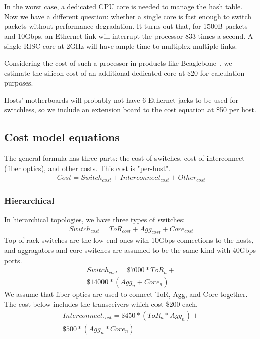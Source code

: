 In the worst case, a dedicated CPU core is needed to manage the hash table. Now we have a different question: whether a single core is fast enough to switch packets without performance degradation. It turns out that, for 1500B packets and 10Gbps, an Ethernet link will interrupt the processor 833 times a second. A single RISC core at 2GHz will have ample time to multiplex multiple links.

Considering the cost of such a processor in products like Beaglebone~\cite{FIXME}, we estimate the silicon cost of an additional dedicated core at \$20 for calculation purposes.

Hosts' motherboards will probably not have 6 Ethernet jacks to be used for switchless, so we include an extension board to the cost equation at \$50 per host.
\vspace{-0.1in}
\subsection{Cost model equations}
The general formula has three parts: the cost of switches, cost of interconnect (fiber optics), and other costs. This cost is "per-host".
\vspace{-0.1in}
\begin{multline}
Cost = Switch_{cost} + Interconnect_{cost} + Other_{cost}
\end{multline}
\subsubsection{Hierarchical}
In hierarchical topologies, we have three types of switches:
\vspace{-0.1in}
\begin{multline}
Switch_{cost} = ToR_{cost} + Agg_{cost} + Core_{cost}
\end{multline}
Top-of-rack switches are the low-end ones with 10Gbps connections to the hosts, and aggragators and core switches are assumed to be the same kind with 40Gbps ports.
\vspace{-0.1in}
\begin{multline}
Switch_{cost} = \$7000 * ToR_n +\\
                \$14000 * (Agg_n + Core_n)
\end{multline}
We assume that fiber optics are used to connect ToR, Agg, and Core together. The cost below includes the transceivers which cost \$200 each.
\vspace{-0.1in}
\begin{multline}
Interconnect_{cost} = \$450 * (ToR_n * Agg_n) +\\
                      \$500 * (Agg_n * Core_n)
\end{multline}
